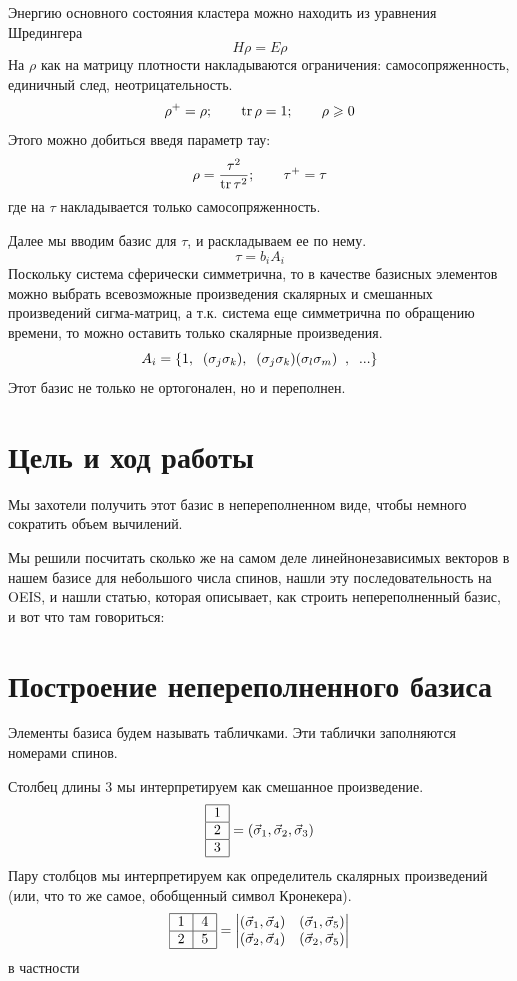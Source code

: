 \documentclass[]{article}
\begin{document}
Энергию основного состояния кластера можно находить из уравнения Шредингера 
$$H \rho = E \rho$$
На $\rho$ как на матрицу плотности накладываются ограничения: самосопряженность, единичный след, неотрицательность.
$${\rho ^ + } = \rho ;\qquad \mathop{\rm{tr}}\rho  = 1;\qquad  \rho  \geqslant 0$$
Этого можно добиться введя параметр тау: 
$$\rho  = \frac{{{\tau ^2}}}{{\mathop{\rm{tr}}{\tau ^2}}};\qquad {\tau ^ + } = \tau $$
где на $\tau$ накладывается только самосопряженность.

Далее мы вводим базис для $\tau$, и раскладываем ее по нему.
$$\tau=b_i A_i$$
Поскольку система сферически симметрична, то в качестве базисных элементов можно выбрать всевозможные произведения 
скалярных и смешанных произведений сигма-матриц, а т.к. система еще симметрична по обращению времени, то можно оставить только скалярные произведения.
$$A_i=\{ 1,  \;\;({\bf \sigma}_j{\bf\sigma}_k), \;\;
({\bf \sigma}_j{\bf\sigma}_k)({\bf \sigma}_l{\bf\sigma}_m)\;\;,\;\;...\}$$
Этот базис не только не ортогонален, но и переполнен.

\section{Цель и ход работы}
Мы захотели получить этот базис в непереполненном виде, чтобы немного сократить объем вычилений.


Мы решили посчитать сколько же на самом деле линейнонезависимых векторов в нашем базисе для небольшого числа спинов,
нашли эту последовательность на OEIS, 
и нашли статью, которая описывает, как строить непереполненный базис, и вот что там говориться:

\section{Построение непереполненного базиса \cite{source_article}}
Элементы базиса будем называть табличками. Эти таблички заполняются номерами спинов.

Столбец длины 3 мы интерпретируем как смешанное произведение.
$$ \begin{tabular}{ | l | }
\hline
1 \\ \hline
2 \\ \hline
3 \\
\hline
\end{tabular} = (\vec \sigma_1, \vec \sigma_2, \vec \sigma_3) $$
Пару столбцов мы интерпретируем как определитель скалярных произведений (или, что то же самое, обобщенный символ Кронекера).
$$ \begin{tabular}{ |l|l| }
\hline
1 & 4 \\ \hline
2 & 5\\ 
\hline
\end{tabular}
 = 
\begin{vmatrix}
(\vec\sigma_1,\vec\sigma_4) & (\vec\sigma_1,\vec\sigma_5)\\
(\vec\sigma_2,\vec\sigma_4) & (\vec\sigma_2,\vec\sigma_5)\\
\end{vmatrix}
$$
в частности
\end{document}
